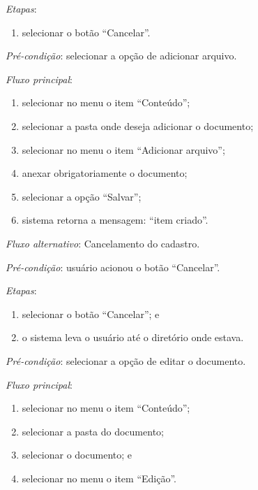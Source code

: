 \documentclass[a4paper,12pt]{article}
\begin{document}
\noindent \textit{Etapas}:

\begin{enumerate}
    \item selecionar o botão ``Cancelar''.
\end{enumerate}



\vspace{0.7cm}

\noindent \textit{Pré-condição}: selecionar a opção de adicionar arquivo.

\noindent \textit{Fluxo principal}:

\begin{enumerate}
    \item selecionar no menu o item ``Conteúdo'';
    \item selecionar a pasta onde deseja adicionar o documento;
    \item selecionar no menu o item ``Adicionar arquivo'';
    \item anexar obrigatoriamente o documento;
    \item selecionar a opção ``Salvar'';
    \item sistema retorna a mensagem: ``item criado''.
\end{enumerate}

\noindent \textit{Fluxo alternativo}: Cancelamento do cadastro.

\noindent \textit{Pré-condição}:  usuário acionou o botão ``Cancelar''.

\noindent \textit{Etapas}:

\begin{enumerate}
    \item selecionar o botão ``Cancelar''; e
    \item o sistema leva o usuário até o diretório onde estava.
\end{enumerate}



\vspace{0.7cm}

\noindent \textit{Pré-condição}: selecionar a opção de editar o documento.

\noindent \textit{Fluxo principal}:

\begin{enumerate}
    \item selecionar no menu o item ``Conteúdo'';
    \item selecionar a pasta do documento;
    \item selecionar o documento; e
    \item selecionar no menu o item ``Edição''.
\end{enumerate}
\end{document}
